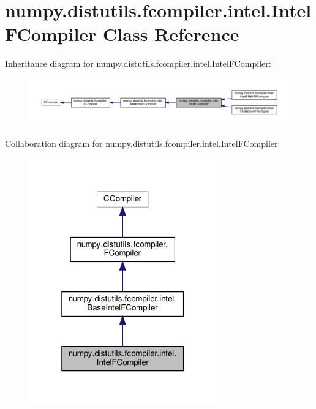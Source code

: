 \hypertarget{classnumpy_1_1distutils_1_1fcompiler_1_1intel_1_1IntelFCompiler}{}\section{numpy.\+distutils.\+fcompiler.\+intel.\+Intel\+F\+Compiler Class Reference}
\label{classnumpy_1_1distutils_1_1fcompiler_1_1intel_1_1IntelFCompiler}


Inheritance diagram for numpy.\+distutils.\+fcompiler.\+intel.\+Intel\+F\+Compiler\+:
\nopagebreak
\begin{figure}[H]
\begin{center}
\leavevmode
\includegraphics[width=350pt]{classnumpy_1_1distutils_1_1fcompiler_1_1intel_1_1IntelFCompiler__inherit__graph}
\end{center}
\end{figure}


Collaboration diagram for numpy.\+distutils.\+fcompiler.\+intel.\+Intel\+F\+Compiler\+:
\nopagebreak
\begin{figure}[H]
\begin{center}
\leavevmode
\includegraphics[width=229pt]{classnumpy_1_1distutils_1_1fcompiler_1_1intel_1_1IntelFCompiler__coll__graph}
\end{center}
\end{figure}
